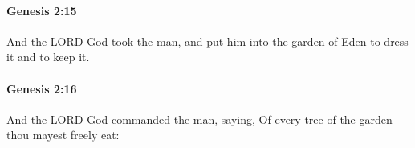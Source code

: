 		\paragraph{Genesis 2:15} %
			\label{GENESIS-2-15}

			And the LORD God took the man, and put him into the garden of Eden to dress it and to keep it.


		\paragraph{Genesis 2:16} %
			\label{GENESIS-2-16}

			And the LORD God commanded the man, saying, Of every tree of the garden thou mayest freely eat:


